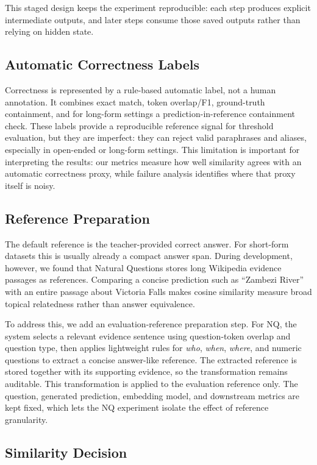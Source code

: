 \documentclass[11pt]{article}
\begin{document}
This staged design keeps the experiment reproducible: each step produces explicit intermediate outputs, and later steps consume those saved outputs rather than relying on hidden state.

\subsection{Automatic Correctness Labels}

Correctness is represented by a rule-based automatic label, not a human annotation. It combines exact match, token overlap/F1, ground-truth containment, and for long-form settings a prediction-in-reference containment check. These labels provide a reproducible reference signal for threshold evaluation, but they are imperfect: they can reject valid paraphrases and aliases, especially in open-ended or long-form settings. This limitation is important for interpreting the results: our metrics measure how well similarity agrees with an automatic correctness proxy, while failure analysis identifies where that proxy itself is noisy.

\subsection{Reference Preparation}

The default reference is the teacher-provided correct answer. For short-form datasets this is usually already a compact answer span. During development, however, we found that Natural Questions stores long Wikipedia evidence passages as references. Comparing a concise prediction such as ``Zambezi River'' with an entire passage about Victoria Falls makes cosine similarity measure broad topical relatedness rather than answer equivalence.

To address this, we add an evaluation-reference preparation step. For NQ, the system selects a relevant evidence sentence using question-token overlap and question type, then applies lightweight rules for \textit{who}, \textit{when}, \textit{where}, and numeric questions to extract a concise answer-like reference. The extracted reference is stored together with its supporting evidence, so the transformation remains auditable.
This transformation is applied to the evaluation reference only. The question, generated prediction, embedding model, and downstream metrics are kept fixed, which lets the NQ experiment isolate the effect of reference granularity.

\subsection{Similarity Decision}
\end{document}
